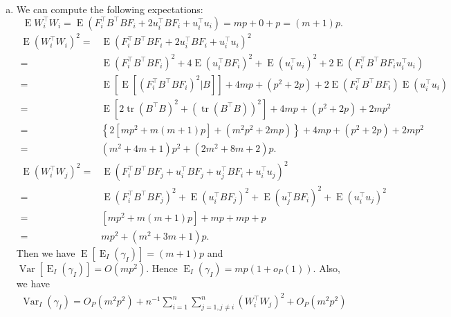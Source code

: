 \documentclass[11pt]{article}
\DeclareMathOperator{\mytr}{tr}
\DeclareMathOperator{\myE}{E}
\DeclareMathOperator{\myVar}{Var}
\theoremstyle{plain}
\theoremstyle{definition}
\theoremstyle{remark}
\begin{document}
\begin{enumerate}[(a)]
        \item
            We can compute the following expectations:
            \begin{equation*}
                \myE W_i^\top W_i = \myE(F_i^\top B^\top B F_i + 2u_i^\top B F_i + u_i^\top u_i) = m p + 0 + p = (m + 1) p.
            \end{equation*}
            \begin{align*}
                \myE (W_i^\top W_i)^2 =& \myE(F_i^\top B^\top B F_i + 2u_i^\top B F_i + u_i^\top u_i)^2 \\
                =& 
            \myE(F_i^\top B^\top B F_i)^2 + 4\myE (u_i^\top B F_i)^2 + \myE (u_i^\top u_i)^2
            + 2 \myE (F_i^\top B^\top B F_i u_i^\top u_i)
            \\
                =& 
                \myE [\myE[(F_i^\top B^\top B F_i)^2| B]] + 4mp + (p^2 + 2p)
            + 2 \myE (F_i^\top B^\top B F_i)\myE( u_i^\top u_i)
            \\
                =& 
                \myE [2\mytr(B^\top B)^2 + (\mytr(B^\top B))^2] + 4mp + (p^2 + 2p)
            + 2 m p^2 
            \\
                =& 
                \left\{2\left[m p^2+ m(m+1) p \right]+ (m^2 p^2 + 2mp)\right\} + 4mp + (p^2 + 2p)
            + 2 m p^2 
            \\
            =&
        (m^2+4m + 1)p^2 + (2m^2 + 8m + 2)p
                .
            \end{align*}
            \begin{align*}
                \myE (W_i^\top W_j)^2
                = &
                \myE (F_i^\top B^\top B F_j + u_i^\top B F_j + u_j^\top B F_i + u_i^\top u_j )^2
                \\
                = &
            \myE (F_i^\top B^\top B F_j)^2 +\myE ( u_i^\top B F_j)^2 + \myE (u_j^\top B F_i)^2 + \myE ( u_i^\top u_j )^2
                \\
                = &
            \left[m p^2+ m(m+1) p \right]
            + mp + mp + p
            \\
            = &  m p^2 + (m^2 + 3m + 1)p.
            \end{align*}
            Then we have $\myE \left[\myE_I (\gamma_I)\right] = (m+1)p$ and $\myVar \left[\myE_I (\gamma_I)\right] = O(m p^2)$.
            Hence $\myE_I (\gamma_I) = mp(1+o_P(1))$.
            Also, we have
            \begin{align*}
                \myVar_I(\gamma_I)=
                O_P(m^2p^2)+ n^{-1}\sum_{i=1}^n \sum_{j=1, j\neq i}^n (W_i^\top W_j)^2 + O_P(m^2 p^2)

\end{align*}
\end{enumerate}
\end{document}
